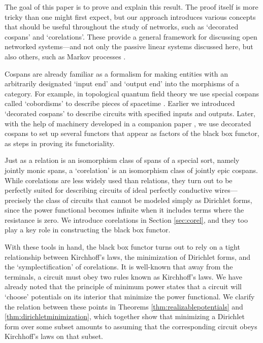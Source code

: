 The goal of this paper is to prove and explain this result. The proof itself is
more tricky than one might first expect, but our approach introduces various
concepts that should be useful throughout the study of networks, such as
`decorated cospans' and `corelations'.  These provide a general framework for
discussing open networked systems---and not only the passive linear systems
discussed here, but also others, such as Markov processes \cite{BFP}.

Cospans are already familiar as a formalism for making entities with an
arbitrarily designated `input end' and `output end' into the morphisms of a
category.  For example, in topological quantum field theory we use special
cospans called `cobordisms' to describe pieces of spacetime \cite{BL,BaezStay}.
Earlier we introduced `decorated cospans' to describe
circuits with specified inputs and outputs.  Later, with the help of machinery
developed in a companion paper \cite{Fon}, we use decorated cospans to set up
several functors that appear as factors of the black box functor, as steps in 
proving its functoriality.

Just as a relation is an isomorphism class of spans of a special sort, namely
jointly monic spans, a `corelation' is an isomorphism class of jointly epic
cospans.  While corelations are less widely used than relations, they turn out
to be perfectly suited for describing circuits of ideal perfectly conductive
wires---precisely the class of circuits that cannot be modeled simply as
Dirichlet forms, since the power functional becomes infinite when it includes
terms where the resistance is zero.  We introduce corelations in Section
\ref{sec:corel}, and they too play a key role in constructing the black box
functor.

With these tools in hand, the black box functor turns out to rely on a tight
relationship between Kirchhoff's laws, the minimization of Dirichlet forms, and
the `symplectification' of corelations. It is well-known that away from the terminals,
a circuit must obey two rules known as Kirchhoff's laws.  We have already noted that 
the principle of minimum power states that a circuit will `choose' potentials on its interior
that minimize the power functional.  We clarify the relation between these points
in Theorems \ref{thm:realizablepotentials} and \ref{thm:dirichletminimization}, 
which together show that minimizing a Dirichlet form over some subset amounts to
assuming that the corresponding circuit obeys Kirchhoff's laws on that subset.

